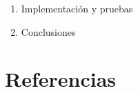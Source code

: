 \documentclass[11pt]{article}
\begin{document}
\begin{enumerate}
\begin{enumerate}[label=5.\arabic*]
	\end{enumerate}
	\item Implementación y pruebas
	\item Conclusiones
\end{enumerate}

\section{Referencias}
\end{document}
